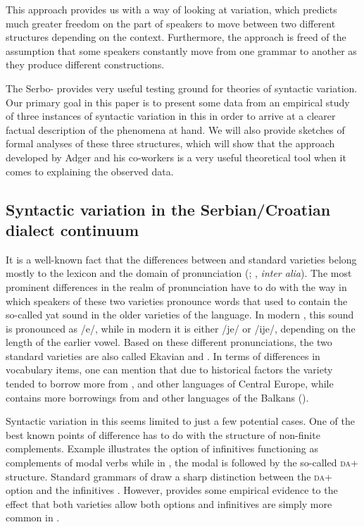 \documentclass[output=paper,modfonts,newtxmath,hidelinks,]{langscibook}
\begin{document}
This approach provides us with a way of looking at variation, which predicts much greater freedom on the part of speakers to move between two different structures depending on the context. Furthermore, the approach is freed of the assumption that some speakers constantly move from one grammar to another as they produce different constructions.

The Serbo-  provides very useful testing ground for theories of syntactic variation. Our primary goal in this paper is to present some data from an empirical study of three instances of syntactic variation in this  in order to arrive at a clearer factual description of the phenomena at hand. We will also provide sketches of formal analyses of these three structures, which will show that the approach developed by Adger and his co-workers is a very useful theoretical tool when it comes to explaining the observed data.

\subsection{Syntactic variation in the Serbian/Croatian dialect continuum}\label{7:s1.2}

It is a well-known fact that the differences between  and  standard varieties belong mostly to the lexicon and the domain of pronunciation (\citealt{CorbettBrowne2009}; \citealt{Bailyn2010}, \textit{inter alia}). The most prominent differences in the realm of pronunciation have to do with the way in which speakers of these two varieties pronounce words that used to contain the so-called yat sound in the older varieties of the language. In modern , this sound is pronounced as /e/, while in modern  it is either /je/ or /ije/, depending on the length of the earlier vowel. Based on these different pronunciations, the two standard varieties are also called Ekavian and . In terms of differences in vocabulary items, one can mention that due to historical factors the  variety tended to borrow more from ,  and other languages of Central Europe, while  contains more borrowings from  and other languages of the Balkans (\citealt{CorbettBrowne2009}).

Syntactic variation in this  seems limited to just a few potential cases. One of the best known points of difference has to do with the structure of non-finite  complements. Example  illustrates the option of infinitives functioning as complements of modal verbs while in , the modal is followed by the so-called \textsc{da}+ structure. Standard grammars of  draw a sharp distinction between the  \textsc{da}+ option and the  infinitives \citep{Katicic}. However, \citet{Bailyn2010} provides some empirical evidence to the effect that both varieties allow both options and infinitives are simply more common in .
\end{document}
